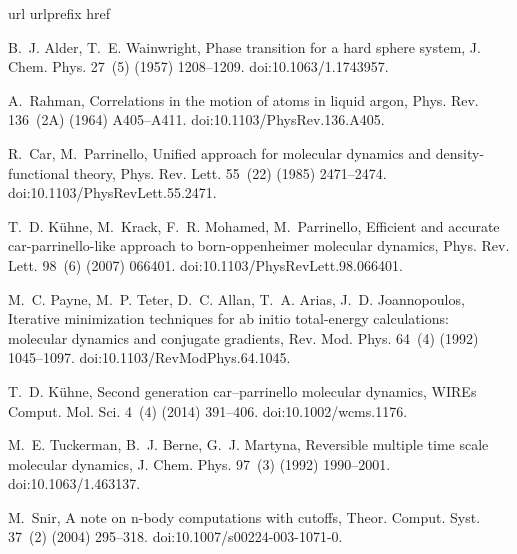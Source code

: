 \documentclass[preprint]{elsarticle}
\begin{document}

\begin{thebibliography}{10}
\expandafter\ifx\csname url\endcsname\relax
  \def\url#1{\texttt{#1}}\fi
\expandafter\ifx\csname urlprefix\endcsname\relax\def\urlprefix{URL }\fi
\expandafter\ifx\csname href\endcsname\relax
  \def\href#1#2{#2} \def\path#1{#1}\fi

B.~J. Alder, T.~E. Wainwright, Phase transition for a hard sphere system, J.
  Chem. Phys. 27~(5) (1957) 1208--1209.
\newblock \href {https://doi.org/10.1063/1.1743957}
  {\path{doi:10.1063/1.1743957}}.

A.~Rahman, Correlations in the motion of atoms in liquid argon, Phys. Rev.
  136~(2A) (1964) A405--A411.
\newblock \href {https://doi.org/10.1103/PhysRev.136.A405}
  {\path{doi:10.1103/PhysRev.136.A405}}.

R.~Car, M.~Parrinello, Unified approach for molecular dynamics and
  density-functional theory, Phys. Rev. Lett. 55~(22) (1985) 2471--2474.
\newblock \href {https://doi.org/10.1103/PhysRevLett.55.2471}
  {\path{doi:10.1103/PhysRevLett.55.2471}}.

T.~D. K\"uhne, M.~Krack, F.~R. Mohamed, M.~Parrinello, Efficient and accurate
  car-parrinello-like approach to born-oppenheimer molecular dynamics, Phys.
  Rev. Lett. 98~(6) (2007) 066401.
\newblock \href {https://doi.org/10.1103/PhysRevLett.98.066401}
  {\path{doi:10.1103/PhysRevLett.98.066401}}.

M.~C. Payne, M.~P. Teter, D.~C. Allan, T.~A. Arias, J.~D. Joannopoulos,
  Iterative minimization techniques for ab initio total-energy calculations:
  molecular dynamics and conjugate gradients, Rev. Mod. Phys. 64~(4) (1992)
  1045--1097.
\newblock \href {https://doi.org/10.1103/RevModPhys.64.1045}
  {\path{doi:10.1103/RevModPhys.64.1045}}.

T.~D. K\"uhne, Second generation car–parrinello molecular dynamics, WIREs
  Comput. Mol. Sci. 4~(4) (2014) 391--406.
\newblock \href {https://doi.org/10.1002/wcms.1176}
  {\path{doi:10.1002/wcms.1176}}.

M.~E. Tuckerman, B.~J. Berne, G.~J. Martyna, Reversible multiple time scale
  molecular dynamics, J. Chem. Phys. 97~(3) (1992) 1990--2001.
\newblock \href {https://doi.org/10.1063/1.463137}
  {\path{doi:10.1063/1.463137}}.

M.~Snir, A note on n-body computations with cutoffs, Theor. Comput. Syst.
  37~(2) (2004) 295--318.
\newblock \href {https://doi.org/10.1007/s00224-003-1071-0}
  {\path{doi:10.1007/s00224-003-1071-0}}.


\end{thebibliography}
\end{document}
